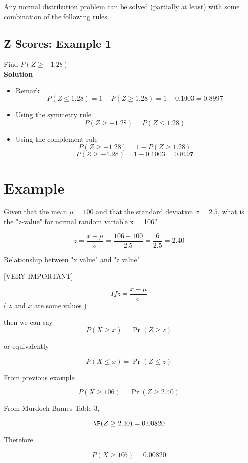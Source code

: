 \documentclass[]{report}
\begin{document}
Any normal distribution problem can be solved (partially at least) with some combination of the following rules.

\subsection{Z Scores: Example 1 }
Find $P(Z \geq -1.28)$\\
\textbf{Solution}\\
\begin{itemize}
\item Remark \[P(Z \leq 1.28) = 1 - P(Z \geq 1.28)  = 1-0.1003 = 0.8997\]
\item Using the symmetry rule
\[P(Z \geq -1.28) = P(Z \leq 1.28) \]
\item Using the complement rule
\[P(Z \geq -1.28) = 1 - P(Z \geq 1.28) \]
\[P(Z \geq -1.28) = 1 - 0.1003 = 0.8997 \]
\end{itemize}





\section{Example}
Given that the mean $\mu  = 100$ and that the standard deviation $\sigma  = 2.5$, what is the "z-value" for normal random variable x = 106?

\[ z  = \frac{x-\mu}{\sigma}   = \frac{106-100}{2.5}  = \frac{6}{2.5} = 2.40\]


Relationship between "x value" and "z  value"

[VERY IMPORTANT]

\[If   z  = \frac{x-\mu}{\sigma}\]( $z$  and $x$  are some values )

then we can say  \[P(X \geq x) = \Pr(Z \geq z)\]

or equivalently


\[P(X \leq x) = \Pr(Z \leq z)\]

From previous example 

\[P(X \geq 106) = \Pr(Z \geq 2.40)\]


From Murdoch Barnes Table 3, 

\[\P(Z \geq 2.40) = 0.00820\] 


Therefore 


\[P(X \geq 106) = 0.00820\] 




\end{document}

